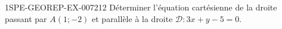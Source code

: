 \begin{exercice}{1SPE-GEOREP-EX-007}{2}{12}
Déterminer l'équation cartésienne de la droite passant par $A(1 ; -2)$ et parallèle à la droite $\mathcal{D} : 3x + y - 5 = 0$.
\end{exercice}
